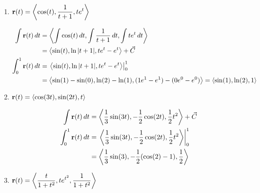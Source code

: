 \begin{enumerate}[leftmargin=0pt]
\begin{enumerate}
    \item $\displaystyle \mathbf{r}(t) = \left\langle \cos(t), \frac{1}{t+1}, te^t \right\rangle$
    \begin{red}
        \begin{align*}
            \int\mathbf{r}(t)\, dt &= \left\langle 
                \int\cos(t)\, dt, 
                \int\frac{1}{t+1}\, dt,
                \int te^t\, dt
            \right\rangle \\
            &= \left\langle
                \sin(t), 
                \ln|t+1|,
                t e^t - e^t
            \right\rangle + \vec{C} \\
            \int_0^1\mathbf{r}(t)\, dt &= \left. \left\langle
                \sin(t), 
                \ln|t+1|,
                t e^t - e^t
            \right\rangle \right|_0^1 \\
            &= \left\langle
                \sin(1) - \sin(0),
                \ln(2) - \ln(1),
                (1e^1-e^1)-(0e^0 - e^0)
            \right\rangle
            = \left\langle
                \sin(1),
                \ln(2),
                1
            \right\rangle
        \end{align*}
    \end{red}
    \item $\displaystyle \mathbf{r}(t) = \left\langle \cos(3t), \sin(2t), t \right\rangle$
    \begin{red}
        \begin{align*}
            \int\mathbf{r}(t)\, dt &= \left\langle
                \frac13 \sin(3t),
                -\frac12 \cos(2t),
                \frac12 t^2
            \right\rangle +\vec{C} \\
            \int_0^1\mathbf{r}(t)\, dt &= \left.\left\langle
                \frac13 \sin(3t),
                -\frac12 \cos(2t),
                \frac12 t^2
            \right\rangle \right|_0^1 \\
            &= \left\langle
                \frac13 \sin(3),
                -\frac12 (\cos(2) - 1),
                \frac12
            \right\rangle
        \end{align*}
    \end{red}
    \item $\displaystyle \mathbf{r}(t) = \left\langle \frac{t}{1+t^2}, te^{t^2}, \frac{1}{1+t^2} \right\rangle$


\end{enumerate}
\end{enumerate}
